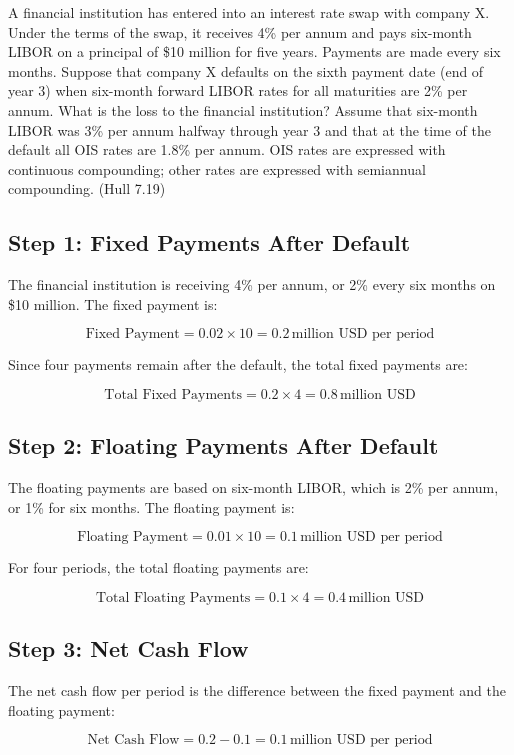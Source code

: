 \documentclass[12pt,letterpaper, onecolumn]{exam}
\begin{document}
\begin{questions}
    \question A financial institution has entered into an interest rate swap with company X. Under
the terms of the swap, it receives 4\% per annum and pays six-month LIBOR on a
principal of \$10 million for five years. Payments are made every six months. Suppose
that company X defaults on the sixth payment date (end of year 3) when six-month
forward LIBOR rates for all maturities are 2\% per annum. What is the loss to the
financial institution? Assume that six-month LIBOR was 3\% per annum halfway through
year 3 and that at the time of the default all OIS rates are 1.8\% per annum. OIS rates are
expressed with continuous compounding; other rates are expressed with semiannual
compounding. (Hull 7.19)

    \begin{solution}
    \subsection*{Step 1: Fixed Payments After Default}
The financial institution is receiving 4\% per annum, or 2\% every six months on \$10 million. The fixed payment is:

\[
\text{Fixed Payment} = 0.02 \times 10 = 0.2 \, \text{million USD per period}
\]

Since four payments remain after the default, the total fixed payments are:

\[
\text{Total Fixed Payments} = 0.2 \times 4 = 0.8 \, \text{million USD}
\]

\subsection*{Step 2: Floating Payments After Default}
The floating payments are based on six-month LIBOR, which is 2\% per annum, or 1\% for six months. The floating payment is:

\[
\text{Floating Payment} = 0.01 \times 10 = 0.1 \, \text{million USD per period}
\]

For four periods, the total floating payments are:

\[
\text{Total Floating Payments} = 0.1 \times 4 = 0.4 \, \text{million USD}
\]

\subsection*{Step 3: Net Cash Flow}
The net cash flow per period is the difference between the fixed payment and the floating payment:

\[
\text{Net Cash Flow} = 0.2 - 0.1 = 0.1 \, \text{million USD per period}
\]


\end{solution}
\end{questions}
\end{document}
